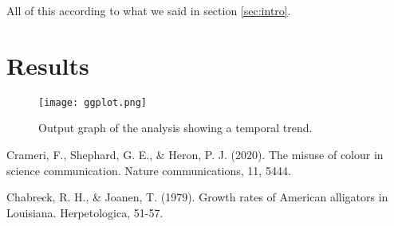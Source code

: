 \documentclass[12pt]{article} %
\begin{document}
All of this according to what we said in section \ref{sec:intro}.

\section{Results}


\begin{figure}[H]
    \centering
    \texttt{[image: ggplot.png]}
    \caption{Output graph of the analysis showing a temporal trend.}
    \label{fig:temporal}
\end{figure}

\begin{thebibliography}{999}

Crameri, F., Shephard, G. E., \& Heron, P. J. (2020). The misuse of colour in science communication. Nature communications, 11, 5444.

Chabreck, R. H., \& Joanen, T. (1979). Growth rates of American alligators in Louisiana. Herpetologica, 51-57.

\end{thebibliography}
\end{document}
